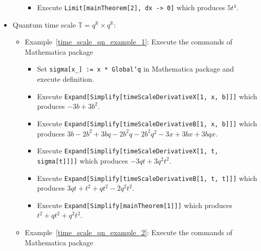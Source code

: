 \begin{itemize}
\begin{itemize}
\begin{itemize}
            \item Execute \texttt{Limit[mainTheorem[2], dx -> 0]} which produces $5t^4$.
        \end{itemize}
    \end{itemize}
    \item Quantum time scale $\mathbb{T} = q^\mathbb{R} \times q^\mathbb{R}$:
    \begin{itemize}
        \item Example~\ref{time_scale_qn_example_1}:
        Execute the commands of Mathematica package
        \begin{itemize}
            \item Set \texttt{sigma[x\_] := x * Global`q} in Mathematica package and execute definition.
            \item Execute \texttt{Expand[Simplify[timeScaleDerivativeX[1, x, b]]]}
            which produces $-3 b + 3 b^2$.
            \item Execute \texttt{Expand[Simplify[timeScaleDerivativeB[1, x, b]]]}
            which produces $3 b - 2 b^2 + 3 b q - 2 b^2 q - 2 b^2 q^2 - 3 x + 3 b x + 3 b q x$.
            \item Execute \texttt{Expand[Simplify[timeScaleDerivativeX[1, t, sigma[t]]]]} which produces $-3 q t + 3 q^2 t^2$.
            \item Execute \texttt{Expand[Simplify[timeScaleDerivativeB[1, t, t]]]} which produces $3 q t + t^2 + q t^2 - 2 q^2 t^2$.
            \item Execute \texttt{Expand[Simplify[mainTheorem[1]]]} which produces $t^2 + q t^2 + q^2 t^2$.
        \end{itemize}
        \item Example~\ref{time_scale_qn_example_2}:
        Execute the commands of Mathematica package
\end{itemize}
\end{itemize}

